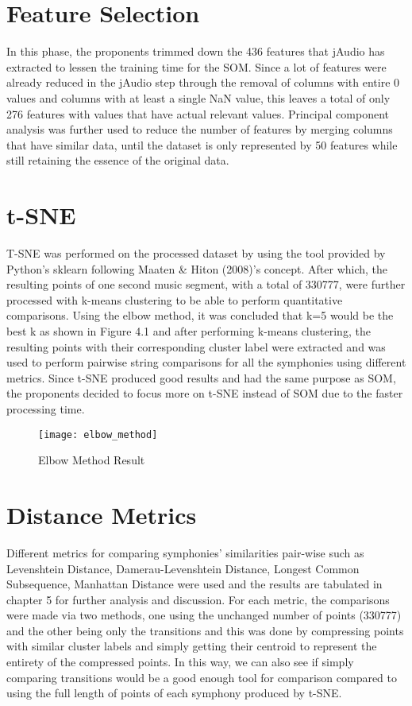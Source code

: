 \section{Feature Selection}
In this phase, the proponents trimmed down the 436 features that jAudio has extracted to lessen the training time for the SOM. Since a lot of features were already reduced in the jAudio step through the removal of columns with entire 0 values and columns with at least a single NaN value, this leaves a total of only 276 features with values that have actual relevant values. Principal component analysis was further used to reduce the number of features by merging columns that have similar data, until the dataset is only represented by 50 features while still retaining the essence of the original data.

\section{t-SNE}
T-SNE was performed on the processed dataset by using the tool provided by Python’s sklearn following Maaten \& Hiton (2008)’s concept. After which, the resulting points of one second music segment, with a total of 330777, were further processed with k-means clustering to be able to perform quantitative comparisons. Using the elbow method, it was concluded that k=5 would be the best k as shown in Figure 4.1 and after performing k-means clustering, the resulting points with their corresponding cluster label were extracted and was used to perform pairwise string comparisons for all the symphonies using different metrics. Since t-SNE produced good results and had the same purpose as SOM, the proponents decided to focus more on t-SNE instead of SOM due to the faster processing time.

\begin{figure}[h]
\caption{Elbow Method Result}
\centering
\texttt{[image: elbow\_method]}
\end{figure}

\section{Distance Metrics}
Different metrics for comparing symphonies’ similarities pair-wise such as Levenshtein Distance, Damerau-Levenshtein Distance, Longest Common Subsequence, Manhattan Distance were used and the results are tabulated in chapter 5 for further analysis and discussion. For each metric, the comparisons were made via two methods, one using the unchanged number of points (330777) and the other being only the transitions and this was done by compressing points with similar cluster labels and simply getting their centroid to represent the entirety of the compressed points. In this way, we can also see if simply comparing transitions would be a good enough tool for comparison compared to using the full length of points of each symphony produced by t-SNE.

